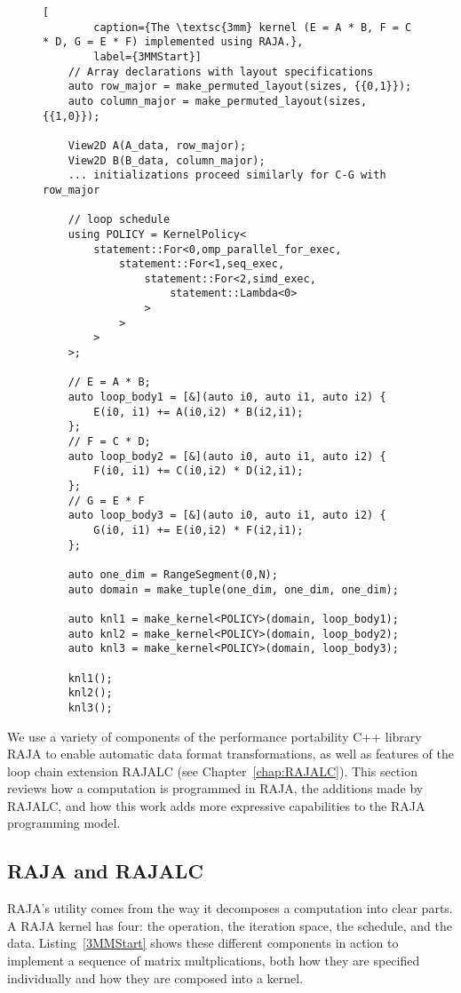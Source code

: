 \begin{figure}
	\begin{lstlisting}[
		caption={The \textsc{3mm} kernel (E = A * B, F = C * D, G = E * F) implemented using RAJA.},
		label={3MMStart}]
	// Array declarations with layout specifications
	auto row_major = make_permuted_layout(sizes, {{0,1}});
	auto column_major = make_permuted_layout(sizes, {{1,0}});

	View2D A(A_data, row_major);
	View2D B(B_data, column_major);
	... initializations proceed similarly for C-G with row_major

	// loop schedule
	using POLICY = KernelPolicy<
		statement::For<0,omp_parallel_for_exec,
			statement::For<1,seq_exec,
				statement::For<2,simd_exec,
					statement::Lambda<0>
				>
			>
		>
	>;

	// E = A * B;
	auto loop_body1 = [&](auto i0, auto i1, auto i2) {
		E(i0, i1) += A(i0,i2) * B(i2,i1);
	};
	// F = C * D;
	auto loop_body2 = [&](auto i0, auto i1, auto i2) {
		F(i0, i1) += C(i0,i2) * D(i2,i1);
	};
	// G = E * F
	auto loop_body3 = [&](auto i0, auto i1, auto i2) {
		G(i0, i1) += E(i0,i2) * F(i2,i1);
	};
	
	auto one_dim = RangeSegment(0,N);
	auto domain = make_tuple(one_dim, one_dim, one_dim);

	auto knl1 = make_kernel<POLICY>(domain, loop_body1);
	auto knl2 = make_kernel<POLICY>(domain, loop_body2);
	auto knl3 = make_kernel<POLICY>(domain, loop_body3);

	knl1();
	knl2();
	knl3();
	\end{lstlisting}

\end{figure}



We use a variety of components of the performance portability C++ library RAJA to enable automatic data format transformations, as well as features of the loop chain extension RAJALC (see Chapter~\ref{chap:RAJALC}).
This section reviews how a computation is programmed in RAJA, the additions made by RAJALC, and how this work adds more expressive capabilities to the RAJA programming model.

\subsection{RAJA and RAJALC}

RAJA's utility comes from the way it decomposes a computation into clear parts.
A RAJA kernel has four: the operation, the iteration space, the schedule, and the data. 
Listing~\ref{3MMStart} shows these different components in action to implement a sequence of matrix multplications, both how they are specified individually and how they are composed into a kernel.

